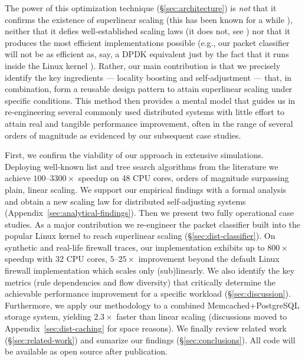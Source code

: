 The power of this optimization technique (\S\ref{sec:architecture}) is \emph{not} that it confirms the existence of superlinear scaling (this has been known for a while \cite{dobb-1, dobb-2}), neither that it defies well-established scaling laws (it does not, see \cite{80148, gunther-hotsos, 10.1016/0167-8191(86)90024-4,10.1145/2773212.2789974}) nor that it produces the most efficient implementations possible (e.g., our packet classifier will not be as efficient as, say, a DPDK equivalent \cite{rte-acl} just by the fact that it runs inside the Linux kernel \cite{295475}). Rather, our main contribution is that we precisely identify the key ingredients --- locality boosting and self-adjustment --- that, in combination, form a reusable design pattern to attain superlinear scaling under specific conditions. This method then provides a mental model that guides us in re-engineering several commonly used distributed systems with little effort to attain real and tangible performance improvement, often in the range of several orders of magnitude as evidenced by our subsequent case studies. 

First, we confirm the viability of our approach in extensive simulations. Deploying well-known list and tree search algorithms from the literature %
we achieve $100$--$3300\times$ speedup on 48 CPU cores, orders of magnitude surpassing plain, linear scaling. We support our empirical findings with a formal analysis and obtain a new scaling law for distributed self-adjusting systems (Appendix~\ref{sec:analytical-findings}). Then we present two fully operational case studies. As a major contribution we re-engineer the packet classifier built into the popular Linux kernel to reach superlinear scaling (\S\ref{sec:dist-classifier}). On synthetic and real-life firewall traces, our implementation exhibits up to $800\times$ speedup with 32 CPU cores, $5$--$25\times$ improvement beyond the default Linux firewall implementation which scales only (sub)linearly. We also identify the key metrics (rule dependencies and flow diversity) that critically determine the achievable performance improvement for a specific workload (\S\ref{sec:discussion}). Furthermore, we apply our methodology to a combined Memcached+PostgreSQL storage system, yielding $2.3\times$ faster than linear scaling (discussions moved to Appendix~\ref{sec:dist-caching} for space reasons). We finally review related work (\S\ref{sec:related-work}) and sumarize our findings (\S\ref{sec:conclusions}). All code will be available as open source after publication. %


